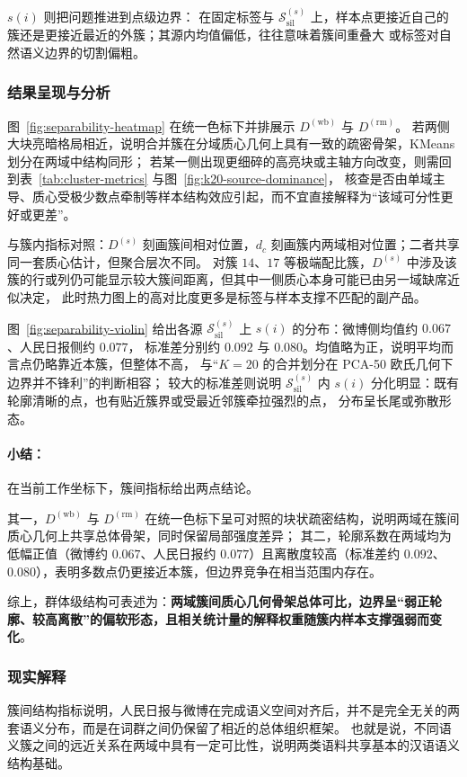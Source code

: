 \documentclass[withoutpreface]{cumcmthesis}
\begin{document}
$s(i)$ 则把问题推进到点级边界：
在固定标签与 $\mathcal{S}_{\mathrm{sil}}^{(s)}$ 上，样本点更接近自己的簇还是更接近最近的外簇；其源内均值偏低，往往意味着簇间重叠大
或标签对自然语义边界的切割偏粗。

\subsubsection{结果呈现与分析}
图~\ref{fig:separability-heatmap} 在统一色标下并排展示 $D^{(\mathrm{wb})}$ 与 $D^{(\mathrm{rm})}$。
若两侧大块亮暗格局相近，说明合并簇在分域质心几何上具有一致的疏密骨架，KMeans 划分在两域中结构同形；
若某一侧出现更细碎的高亮块或主轴方向改变，则需回到表~\ref{tab:cluster-metrics} 与图~\ref{fig:k20-source-dominance}，
核查是否由单域主导、质心受极少数点牵制等样本结构效应引起，而不宜直接解释为“该域可分性更好或更差”。

与簇内指标对照：$D^{(s)}$ 刻画簇间相对位置，$d_c$ 刻画簇内两域相对位置；二者共享同一套质心估计，但聚合层次不同。
对簇 $14$、$17$ 等极端配比簇，$D^{(s)}$ 中涉及该簇的行或列仍可能显示较大簇间距离，但其中一侧质心本身可能已由另一域缺席近似决定，
此时热力图上的高对比度更多是标签与样本支撑不匹配的副产品。

图~\ref{fig:separability-violin} 给出各源 $\mathcal{S}_{\mathrm{sil}}^{(s)}$ 上 $s(i)$ 的分布：微博侧均值约 $0.067$、人民日报侧约 $0.077$，
标准差分别约 $0.092$ 与 $0.080$。均值略为正，说明平均而言点仍略靠近本簇，但整体不高，
与“$K=20$ 的合并划分在 PCA-50 欧氏几何下边界并不锋利”的判断相容；
较大的标准差则说明 $\mathcal{S}_{\mathrm{sil}}^{(s)}$ 内 $s(i)$ 分化明显：既有轮廓清晰的点，也有贴近簇界或受最近邻簇牵拉强烈的点，
分布呈长尾或弥散形态。

\paragraph{小结：} 在当前工作坐标下，簇间指标给出两点结论。

其一，$D^{(\mathrm{wb})}$ 与 $D^{(\mathrm{rm})}$ 在统一色标下呈可对照的块状疏密结构，说明两域在簇间质心几何上共享总体骨架，同时保留局部强度差异；
其二，轮廓系数在两域均为低幅正值（微博约 $0.067$、人民日报约 $0.077$）且离散度较高（标准差约 $0.092$、$0.080$），表明多数点仍更接近本簇，但边界竞争在相当范围内存在。

综上，群体级结构可表述为：\textbf{两域簇间质心几何骨架总体可比，边界呈“弱正轮廓、较高离散”的偏软形态，且相关统计量的解释权重随簇内样本支撑强弱而变化}。

\subsubsection{现实解释}
簇间结构指标说明，人民日报与微博在完成语义空间对齐后，并不是完全无关的两套语义分布，而是在词群之间仍保留了相近的总体组织框架。
也就是说，不同语义簇之间的远近关系在两域中具有一定可比性，说明两类语料共享基本的汉语语义结构基础。
\end{document}
